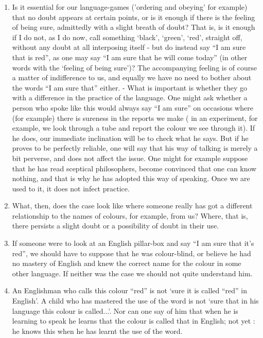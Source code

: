 \documentclass{book}
\begin{document}
\begin{enumerate}
\item
Is it essential for our language-games ('ordering and obeying' for example)
that no doubt appears at certain points, or is it enough if there is the
feeling of being sure, admittedly with a slight breath of doubt?  That is, is
it enough if I do not, as I do now, call something `black', `green', `red',
straight off, without any doubt at all interposing itself - but do instead say
``I am sure that is red'', as one may say ``I am sure that he will come today''
(in other words with the `feeling of being sure')?  The accompanying feeling is
of course a matter of indifference to us, and equally we have no need to bother
about the words ``I am sure that'' either. - What is important is whether they
go with a difference in the practice of the language.  One might ask whether a
person who spoke like this would always say ``I am sure'' on occasions where
(for example) there is sureness in the reports we make ( in an experiment, for
example, we look through a tube and report the colour we see through it). If he
does, our immediate inclination will be to check what he says. But if he proves
to be perfectly reliable, one will say that his way of talking is merely a bit
perverse, and does not affect the issue. One might for example suppose that he
has read sceptical philosophers, become convinced that one can know nothing,
and that is why he has adopted this way of speaking. Once we are used to it, it
does not infect practice.

\item
What, then, does the case look like where someone really has got a different
relationship to the names of colours, for example, from us? Where, that is,
there persists a slight doubt or a possibility of doubt in their use.

\item
If someone were to look at an English pillar-box and say ``I am sure that it's
red'', we should have to suppose that he was colour-blind, or believe he had no
mastery of English and knew the correct name for the colour in some other
language.  If neither was the case we should not quite understand him.

\item
An Englishman who calls this colour ``red'' is not `sure it is called ``red''
in English'.  A child who has mastered the use of the word is not `sure that in
his language this colour is called...'. Nor can one say of him that when he is
learning to speak he learns that the colour is called that in English; not yet
: he knows this when he has learnt the use of the word.


\end{enumerate}
\end{document}

